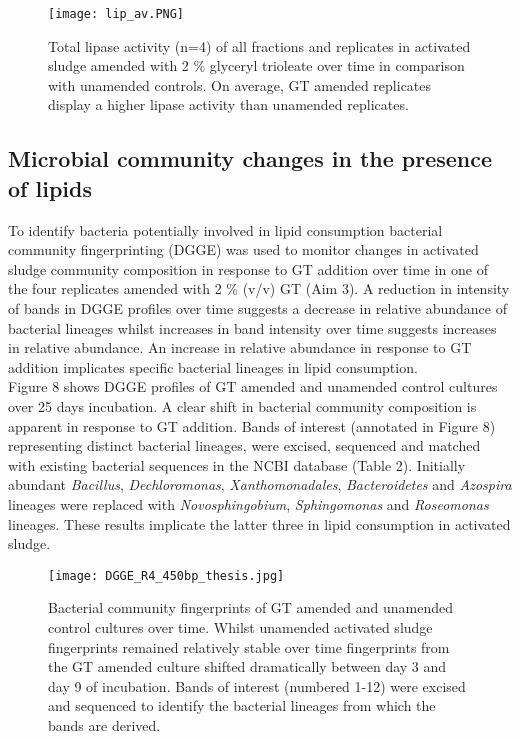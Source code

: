 \documentclass[twoside]{article}
\begin{document}
\begin{figure}
\texttt{[image: lip\_av.PNG]}
\caption{Total lipase activity (n=4) of all fractions and replicates in activated sludge amended with 2 \% glyceryl trioleate over time in comparison with unamended controls. On average, GT amended replicates display a higher lipase activity than unamended replicates.}
\end{figure}
\FloatBarrier

\subsection{Microbial community changes in the presence of lipids}
To identify bacteria potentially involved in lipid consumption bacterial community fingerprinting (DGGE) was used to monitor changes in activated sludge community composition in response to GT addition over time in one of the four replicates amended with 2 \% (v/v) GT (Aim 3). A reduction in intensity of bands in DGGE profiles over time suggests a decrease in relative abundance of bacterial lineages whilst increases in band intensity over time suggests increases in relative abundance. An increase in relative abundance in response to GT addition implicates specific bacterial lineages in lipid consumption.\\

Figure 8 shows DGGE profiles of GT amended and unamended control cultures over 25 days incubation. A clear shift in bacterial community composition is apparent in response to GT addition. Bands of interest (annotated in Figure 8) representing distinct bacterial lineages, were excised, sequenced and matched with existing bacterial sequences in the NCBI database (Table 2). Initially abundant \emph{Bacillus}, \emph{Dechloromonas}, \emph{Xanthomonadales}, \emph{Bacteroidetes} and \emph{Azospira} lineages were replaced with \emph{Novosphingobium}, \emph{Sphingomonas} and \emph{Roseomonas} lineages. These results implicate the latter three in lipid consumption in activated sludge.\\

\begin{figure}
\texttt{[image: DGGE\_R4\_450bp\_thesis.jpg]}
\caption{Bacterial community fingerprints of GT amended and unamended control cultures over time. Whilst unamended activated sludge fingerprints remained relatively stable over time fingerprints from the GT amended culture shifted dramatically between day 3 and day 9 of incubation. Bands of interest (numbered 1-12) were excised and sequenced to identify the bacterial lineages from which the bands are derived.}
\end{figure}
\end{document}

